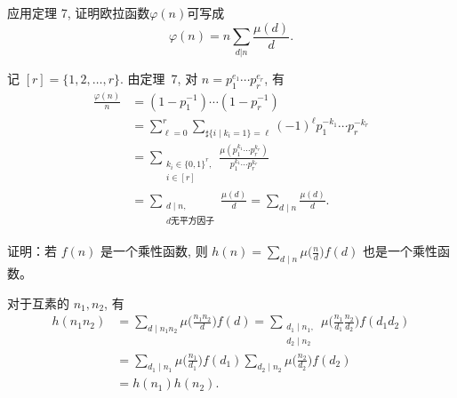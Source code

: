 \setcounter{pb}{15}
\begin{problem}
    应用定理 7, 证明欧拉函数$\varphi(n)$可写成
        \[
            \varphi(n)=n\sum_{d|n}\frac{\mu(d)}d.
        \]
\end{problem}

\begin{solution}
    记 $[r]=\{1,2,\dots,r\}$. 由定理~7, 对 $n=p_{1}^{e_{1}}\cdots p_{r}^{e_{r}}$, 有
        \[
            \begin{split}
                \frac{\varphi(n)}{n}
                &= (1-p_{1}^{-1})\cdots(1-p_{r}^{-1})\\
                &= \sum_{\ell=0}^{r}\sum_{\sharp\{i\mid k_{i}=1\}=\ell}(-1)^{\ell}p_{1}^{-k_{1}}\cdots p_{r}^{-k_{r}}\\
                &= \sum_{\substack{k_{i}\in\{0,1\}^{r},\\ i\in[r]}}\frac{\mu(p_{1}^{k_{1}}\cdots p_{r}^{k_{r}})}{p_{1}^{k_{1}}\cdots p_{r}^{k_{r}}}\\
                &= \sum_{\substack{d\mid n,\\ d\text{无平方因子}}} \frac{\mu(d)}{d}
                 = \sum_{d\mid n} \frac{\mu(d)}{d}.
            \end{split}
        \]
\end{solution}

\setcounter{pb}{18}

\begin{problem}
    证明：若 $f(n)$ 是一个乘性函数, 则 $h(n) = \sum_{d \mid n} \mu \big( \frac{n}{d} \big) f(d)$ 也是一个乘性函数。
\end{problem}

\begin{solution}
    对于互素的 $n_{1},n_{2}$, 有
        \[
            \begin{split}
                h(n_{1}n_{2})
                &=\sum_{d\mid n_{1}n_{2}}\mu\Big(\frac{n_{1}n_{2}}{d}\Big)f(d)=
                \sum_{\substack{d_{1}\mid n_{1},\\d_{2}\mid n_{2}}}\mu\Big(\frac{n_{1}}{d_{1}}\frac{n_{2}}{d_{2}}\Big)f(d_{1}d_{2})\\
                &=\sum_{d_{1}\mid n_{1}}\mu\Big(\frac{n_{1}}{d_{1}}\Big)f(d_{1})\sum_{d_{2}\mid n_{2}}\mu\Big(\frac{n_{2}}{d_{2}}\Big)f(d_{2})\\
                &=h(n_{1})h(n_{2}).
            \end{split}
        \]
\end{solution}

\setcounter{pb}{21}

